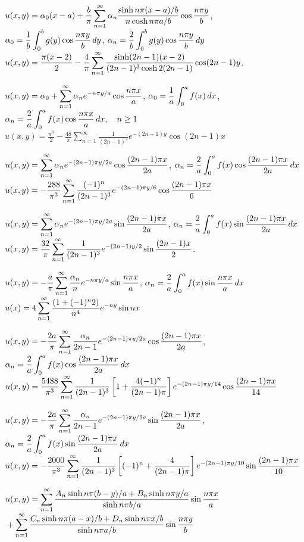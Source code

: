 $\displaystyle
u(x,y)=\alpha_0(x-a)+\frac{b}{\pi}\sum_{n=1}^\infty\alpha_n\frac{\sinh
n\pi(x-a)/b
}{ n\cosh n\pi a/b}
\cos\frac{n\pi y}{b}$,\quad
$\displaystyle\alpha_0=\frac{1}{b}\int_0^bg(y)\cos\frac{n\pi y}{b}\,dy$,
$\displaystyle\alpha_n=\frac{2}{b}\int_0^b g(y)\cos
\frac{n\pi y}{b}\,dy$
$u(x,y)=\displaystyle\frac{\pi(x-2)}{2}-\frac{4}{\pi}\sum_{n=1}^\infty
\frac{\sinh(2n-1)(x-2)}{(2n-1)^3\cosh2(2n-1)}
\cos(2n-1)y$.

$u(x,y)=\displaystyle\alpha_0+\sum_{n=1}^\infty\alpha_n e^{-n\pi y/a}\cos
\frac{n\pi x}{a}$,\quad
$\alpha_0=\displaystyle\frac{1}{a}\int_0^a f(x)\,dx$,
$\alpha_n=\displaystyle\frac{2}{a}\int_0^a f(x)\cos
\frac{n\pi x}{a}\,dx,\quad n\ge1$
$u(x,y)=\frac{\pi^3}{2}-\frac{48}{\pi}\sum_{n=1}^\infty\frac{1}{(2n-1)^4}e^{-(2n-1)y}\cos(2n-1)x$

$u(x,y)=\displaystyle\sum_{n=1}^\infty\alpha_n e^{-(2n-1)\pi y/2a}\cos
\frac{(2n-1)\pi x}{2a}$,\quad
$\alpha_n=\displaystyle\frac{2}{a}\int_0^a
f(x)\cos\frac{(2n-1)\pi x}{2a}\,dx$
$u(x,y)=-\displaystyle
\frac{288}{\pi^3}\sum_{n=1}^\infty\frac{(-1)^n}{(2n-1)^3}e^{-(2n-1)\pi y/6}\cos\frac{(2n-1)\pi x}{6}$

$u(x,y)=\displaystyle\sum_{n=1}^\infty\alpha_ne^{-(2n-1)\pi y/2a}\sin
\frac{(2n-1)\pi x}{2a}$,\quad
$\alpha_n=\displaystyle\frac{2}{a}\int_0^a
f(x)\sin\frac{(2n-1)\pi x}{2a}\,dx$
$u(x,y)=\displaystyle
\frac{32}{\pi}\sum_{n=1}^\infty\frac{1}{(2n-1)^3}e^{-(2n-1)y/2}\sin\frac{(2n-1) x}{2}$.

$u(x,y)=-\displaystyle\frac{a}{\pi}\sum_{n=1}^\infty\frac{\alpha_n}{n} e^{-n\pi
y/a}\sin
\frac{n\pi x}{a}$, \quad
$\alpha_n=\displaystyle\frac{2}{a}\int_0^a
f(x)\sin \frac{n\pi x}{a}\,dx$
$u(x)=\displaystyle4\sum_{n=1}^\infty\frac{(1+(-1)^n2)}{n^4}
e^{-ny}\sin nx$

$u(x,y)=-\displaystyle\frac{2a}{\pi}\sum_{n=1}^\infty\frac{\alpha_n}{2n-1}
e^{-(2n-1)\pi y/2a}\cos
\frac{(2n-1)\pi x}{2a}$,\quad
$\alpha_n=\displaystyle\frac{2}{a}\int_0^a
f(x)\cos\frac{(2n-1)\pi x}{2a}\,dx$
$u(x,y)=\displaystyle\frac{5488}{\pi^3}\sum_{n=1}^\infty\frac{1}{(2n-1)^3}\left[
1+\frac{4(-1)^n}{(2n-1)\pi}\right]e^{-(2n-1)\pi y/14}\cos\frac{(2n-1)\pi
x}{14}$

$u(x,y)=\displaystyle-\frac{2a}{\pi}\sum_{n=1}^\infty\frac{\alpha_n}{2n-1}e^{-(2n-1)\pi
y/2a}\sin
\frac{(2n-1)\pi x}{2a}$,\quad
$\alpha_n=\displaystyle\frac{2}{a}\int_0^a
f(x)\sin\frac{(2n-1)\pi x}{2a}\,dx$
$u(x,y)=-\displaystyle\frac{2000}{\pi^3}\sum_{n=1}^\infty
\frac{1}{(2n-1)^3}
\left[(-1)^n+\frac{4}{(2n-1)\pi}\right]e^{-(2n-1)\pi y/10}
\sin\frac{(2n-1)\pi x}{10}$

$u(x,y)=\displaystyle
\sum_{n=1}^\infty\frac{A_n\sinh n\pi(b-y)/a+B_n\sinh n\pi y/a}{\sinh
n\pi b/a}\sin\frac{n\pi x}{a}$\\
\hspace*{6.25em}$\displaystyle{}+\sum_{n=1}^\infty
\frac{C_n\sinh n\pi(a-x)/b+D_n\sinh n\pi x/b}{\sinh n\pi a/b}
\sin\frac{n\pi y}{b}$

